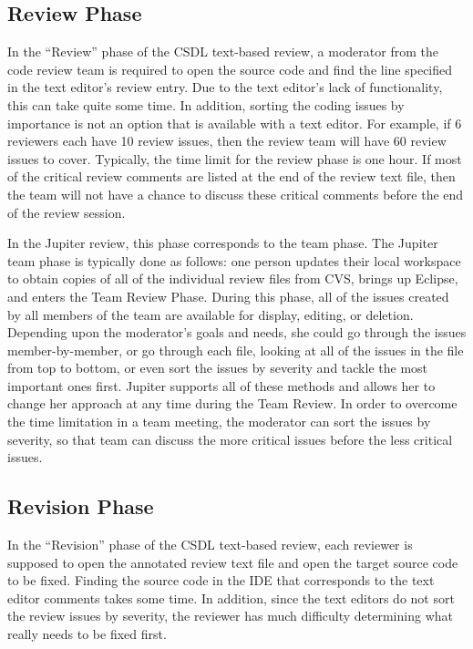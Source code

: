 \subsection{Review Phase}
\label{subsec:review-phase}

In the ``Review'' phase of the CSDL text-based review, a moderator from the code review team is required to open the source code and find the line specified in the text editor's review entry. Due to the text editor's lack of functionality, this can take quite some time. In addition, sorting the coding issues by importance is not an option that is available with a text editor. For example, if 6 reviewers each have 10 review issues, then the review team will have 60 review issues to cover. Typically, the time limit for the review phase is one hour. If most of the critical review comments are listed at the end of the review text file, then the team will not have a chance to discuss these critical comments before the end of the review session.

In the Jupiter review, this phase corresponds to the team phase.  The Jupiter team phase is typically done as follows: one person updates their local workspace to obtain copies of all of the individual review files from CVS, brings up Eclipse, and enters the Team Review Phase.  During this phase, all of the issues created by all members of the team are available for display, editing, or deletion. Depending upon the moderator's goals and needs, she could go through the issues member-by-member, or go through each file, looking at all of the issues in the file from top to bottom, or even sort the issues by severity and tackle the most important ones first. Jupiter supports all of these methods and allows her to change her approach at any time during the Team Review. In order to overcome the time limitation in a team meeting, the moderator can sort the issues by severity, so that team can discuss the more critical issues before the less critical issues.

\subsection{Revision Phase}
\label{subsec:revision-phase}

In the ``Revision'' phase of the CSDL text-based review, each reviewer is supposed to open the annotated review text file and open the target source code to be fixed. Finding the source code in the IDE that corresponds to the text editor comments takes some time. In addition, since the text editors do not sort the review issues by severity, the reviewer has much difficulty determining what really needs to be fixed first.

